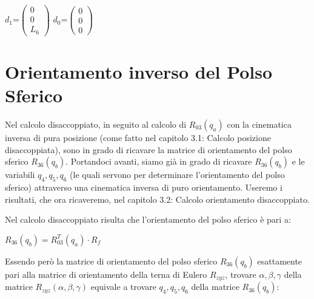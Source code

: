 \documentclass[a4paper,12pt]{article}
\begin{document}
\begin{center}
$ d_1 $=$\begin{pmatrix}
0\\
0\\
L_6\end{pmatrix}$
\space
$ d_0 $=$\begin{pmatrix}
0\\
0\\
0\end{pmatrix}$
\end{center}

\section{Orientamento inverso del Polso Sferico}
Nel calcolo disaccoppiato, in seguito al calcolo di $R_{03}(q_a)$ con la cinematica inversa di pura posizione (come fatto nel capitolo 3.1: Calcolo posizione disaccoppiata), sono in grado di ricavare la matrice di orientamento del polso sferico $R_{36}(q_b)$.
Portandoci avanti, siamo già in grado di ricavare $R_{36}(q_b)$ e le variabili $q_4,q_5,q_6$ (le quali servono per determinare l'orientamento del polso sferico) attraverso una cinematica inversa di puro orientamento. Useremo i risultati, che ora ricaveremo, nel capitolo 3.2: Calcolo orientamento disaccoppiato.


Nel calcolo disaccoppiato risulta che l'orientamento del polso sferico è pari a:

\begin{center}
$ R_{36}(q_b) =  R_{03}^T(q_a) \cdot R_f $
 \end{center}


Essendo però la matrice di orientamento del polso sferico $R_{36}(q_b)$ esattamente
pari alla matrice di orientamento della terna di Eulero $ R_{zyz} $,
trovare $ \alpha,\beta,\gamma $ della matrice $ R_{zyz}(\alpha,\beta,\gamma) $ equivale a trovare $q_4,q_5,q_6$ della matrice $R_{36}(q_b)$:
\end{document}
